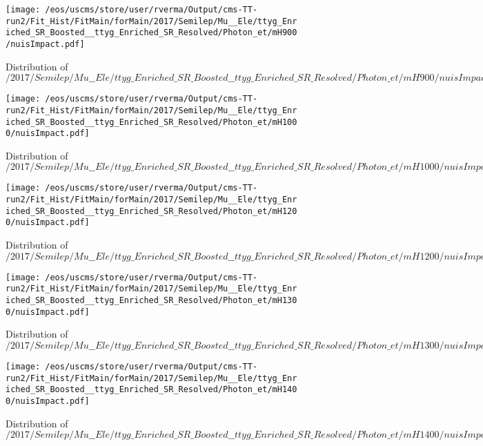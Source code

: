 \begin{figure}
\centering
\texttt{[image: /eos/uscms/store/user/rverma/Output/cms-TT-run2/Fit\_Hist/FitMain/forMain/2017/Semilep/Mu\_\_Ele/ttyg\_Enriched\_SR\_Boosted\_\_ttyg\_Enriched\_SR\_Resolved/Photon\_et/mH900/nuisImpact.pdf]}
\caption{Distribution of $/2017/Semilep/Mu\_\_Ele/ttyg\_Enriched\_SR\_Boosted\_\_ttyg\_Enriched\_SR\_Resolved/Photon\_et/mH900/nuisImpact.pdf$}
\end{figure}

\begin{figure}
\centering
\texttt{[image: /eos/uscms/store/user/rverma/Output/cms-TT-run2/Fit\_Hist/FitMain/forMain/2017/Semilep/Mu\_\_Ele/ttyg\_Enriched\_SR\_Boosted\_\_ttyg\_Enriched\_SR\_Resolved/Photon\_et/mH1000/nuisImpact.pdf]}
\caption{Distribution of $/2017/Semilep/Mu\_\_Ele/ttyg\_Enriched\_SR\_Boosted\_\_ttyg\_Enriched\_SR\_Resolved/Photon\_et/mH1000/nuisImpact.pdf$}
\end{figure}

\begin{figure}
\centering
\texttt{[image: /eos/uscms/store/user/rverma/Output/cms-TT-run2/Fit\_Hist/FitMain/forMain/2017/Semilep/Mu\_\_Ele/ttyg\_Enriched\_SR\_Boosted\_\_ttyg\_Enriched\_SR\_Resolved/Photon\_et/mH1200/nuisImpact.pdf]}
\caption{Distribution of $/2017/Semilep/Mu\_\_Ele/ttyg\_Enriched\_SR\_Boosted\_\_ttyg\_Enriched\_SR\_Resolved/Photon\_et/mH1200/nuisImpact.pdf$}
\end{figure}

\begin{figure}
\centering
\texttt{[image: /eos/uscms/store/user/rverma/Output/cms-TT-run2/Fit\_Hist/FitMain/forMain/2017/Semilep/Mu\_\_Ele/ttyg\_Enriched\_SR\_Boosted\_\_ttyg\_Enriched\_SR\_Resolved/Photon\_et/mH1300/nuisImpact.pdf]}
\caption{Distribution of $/2017/Semilep/Mu\_\_Ele/ttyg\_Enriched\_SR\_Boosted\_\_ttyg\_Enriched\_SR\_Resolved/Photon\_et/mH1300/nuisImpact.pdf$}
\end{figure}

\begin{figure}
\centering
\texttt{[image: /eos/uscms/store/user/rverma/Output/cms-TT-run2/Fit\_Hist/FitMain/forMain/2017/Semilep/Mu\_\_Ele/ttyg\_Enriched\_SR\_Boosted\_\_ttyg\_Enriched\_SR\_Resolved/Photon\_et/mH1400/nuisImpact.pdf]}
\caption{Distribution of $/2017/Semilep/Mu\_\_Ele/ttyg\_Enriched\_SR\_Boosted\_\_ttyg\_Enriched\_SR\_Resolved/Photon\_et/mH1400/nuisImpact.pdf$}
\end{figure}

